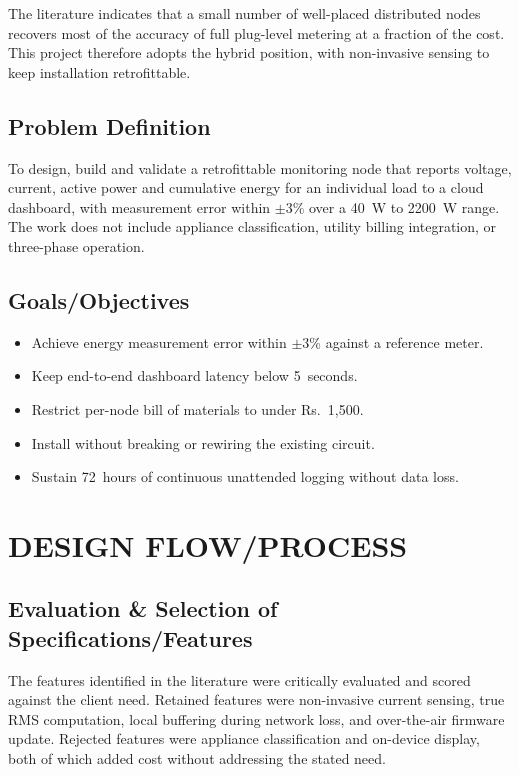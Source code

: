 \documentclass[12pt,a4paper]{report}
\begin{document}
The literature indicates that a small number of well-placed distributed nodes
recovers most of the accuracy of full plug-level metering at a fraction of the
cost. This project therefore adopts the hybrid position, with non-invasive
sensing to keep installation retrofittable.

\section{Problem Definition}

To design, build and validate a retrofittable monitoring node that reports
voltage, current, active power and cumulative energy for an individual load to
a cloud dashboard, with measurement error within $\pm$3\% over a 40~W to
2200~W range. The work does not include appliance classification, utility
billing integration, or three-phase operation.

\section{Goals/Objectives}

\begin{itemize}
  \item Achieve energy measurement error within $\pm$3\% against a reference meter.
  \item Keep end-to-end dashboard latency below 5~seconds.
  \item Restrict per-node bill of materials to under Rs.~1,500.
  \item Install without breaking or rewiring the existing circuit.
  \item Sustain 72~hours of continuous unattended logging without data loss.
\end{itemize}

\chapter{DESIGN FLOW/PROCESS}

\section{Evaluation \& Selection of Specifications/Features}

The features identified in the literature were critically evaluated and scored
against the client need. Retained features were non-invasive current sensing,
true RMS computation, local buffering during network loss, and over-the-air
firmware update. Rejected features were appliance classification and on-device
display, both of which added cost without addressing the stated need.
\end{document}
